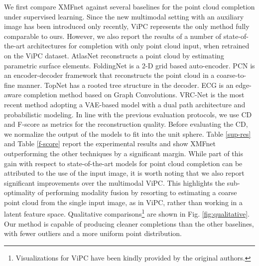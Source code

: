 \documentclass{article}
\begin{document}
We first compare XMFnet against several baselines for the point cloud completion under supervised learning. Since the new multimodal setting with an auxiliary image has been introduced only recently, ViPC \cite{vipc} represents the only method fully comparable to ours. However, we also report the results of a number of state-of-the-art architectures for completion with only point cloud input, when retrained on the ViPC dataset. AtlasNet\cite{atlas} reconstructs a point cloud by estimating parametric surface elements. FoldingNet\cite{folding} is a 2-D grid based auto-encoder. PCN\cite{pcn} is an encoder-decoder framework that reconstructs the point cloud in a coarse-to-fine manner. TopNet\cite{topnet} has a rooted tree structure in the decoder. ECG\cite{ecg} is an edge-aware completion method based on Graph Convolutions. VRC-Net\cite{vrc} is the most recent method adopting a VAE-based model with a dual path architecture and probabilistic modeling. In line with the previous evaluation protocols, we use CD and F-score \cite{fscore} as metrics for the reconstruction quality. Before evaluating the CD, we normalize the output of the models to fit into the unit sphere. Table \ref{sup-res} and Table \ref{f-score} report the experimental results and show XMFnet outperforming the other techniques by a significant margin. While part of this gain with respect to state-of-the-art models for point cloud completion can be attributed to the use of the input image, it is worth noting that we also report significant improvements over the multimodal ViPC. This highlights the sub-optimality of performing modality fusion by resorting to estimating a coarse point cloud from the single input image, as in ViPC, rather than working in a latent feature space.
Qualitative comparisons\footnote{Visualizations for ViPC \cite{vipc} have been kindly provided by the original authors.} are shown in Fig. \ref{fig:qualitative}. Our method is capable of producing cleaner completions than the other baselines, with fewer outliers and a more uniform point distribution.
\end{document}
